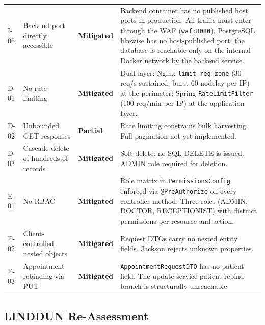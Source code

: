 \documentclass[12pt,a4paper]{report}
\begin{document}
\begin{longtable}{S{1.3cm} S{3.0cm} S{2.0cm} p{6.7cm}}
I-06 & Backend port directly accessible & \textbf{\textcolor{sevlow}{Mitigated}} &
  Backend container has no published host ports in production. All traffic must enter
  through the WAF (\texttt{waf:8080}). PostgreSQL likewise has no host-published port;
  the database is reachable only on the internal Docker network by the backend service. \\[6pt]

D-01 & No rate limiting & \textbf{\textcolor{sevlow}{Mitigated}} &
  Dual-layer: Nginx \texttt{limit\_req\_zone} (30 req/s sustained, burst 60 nodelay per IP)
  at the perimeter; Spring \texttt{RateLimitFilter} (100 req/min per IP) at the
  application layer. \\[6pt]

D-02 & Unbounded GET responses & \textbf{\textcolor{sevmedium}{Partial}} &
  Rate limiting constrains bulk harvesting. Full pagination not yet implemented. \\[6pt]

D-03 & Cascade delete of hundreds of records & \textbf{\textcolor{sevlow}{Mitigated}} &
  Soft-delete: no SQL DELETE is issued. ADMIN role required for deletion. \\[6pt]

E-01 & No RBAC & \textbf{\textcolor{sevlow}{Mitigated}} &
  Role matrix in \texttt{PermissionsConfig} enforced via \texttt{@PreAuthorize} on
  every controller method. Three roles (ADMIN, DOCTOR, RECEPTIONIST) with distinct
  permissions per resource and action. \\[6pt]

E-02 & Client-controlled nested objects & \textbf{\textcolor{sevlow}{Mitigated}} &
  Request DTOs carry no nested entity fields. Jackson rejects unknown properties. \\[6pt]

E-03 & Appointment rebinding via PUT & \textbf{\textcolor{sevlow}{Mitigated}} &
  \texttt{AppointmentRequestDTO} has no patient field. The update service patient-rebind
  branch is structurally unreachable. \\

\end{longtable}

\subsection{LINDDUN Re-Assessment}
\end{document}
